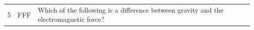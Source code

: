 \documentclass[10pt]{article}
\begin{document}
\begin{tiny}
\begin{longtable}{r p{0.3in} p{1.212in} p{3.8in}}
    5  &          FFF &                                                                                                                                                                                            Which of the following is a difference between gravity and the electromagnetic force? &                                                                                                                                                                                                                                                                                                                                                                                                                                                                                                                                                                                                                                                                                                                                                                                                                                                                                                                                                                                                                                                                                                                                                                                                                                                                                                                                                                                                                                                                                                                                                                                                                                                                                                                                                                                                                                                                                                                                                                                                                                                                                                                                                                                                                                                                                                                                                                                                                                                                                                                                                                                                                                                                                                                                                                                                                                                                                                                                                                                                                                                                                               
\end{longtable}
\end{tiny}
\end{document}
